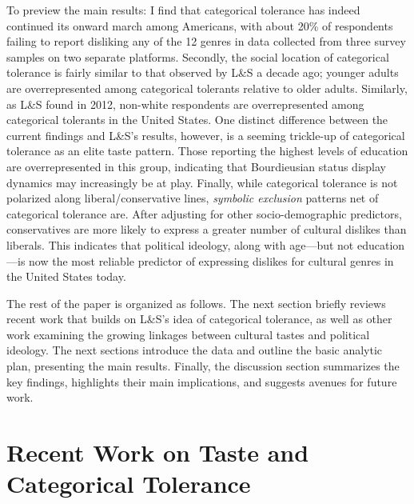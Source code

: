 \documentclass[12pt]{article}
\begin{document}
To preview the main results: I find that categorical tolerance has indeed continued its onward march among Americans, with about 20\% of respondents failing to report disliking any of the 12 genres in data collected from three survey samples on two separate platforms. Secondly, the social location of categorical tolerance is fairly similar to that observed by L\&S a decade ago; younger adults are overrepresented among categorical tolerants relative to older adults. Similarly, as L\&S found in 2012, non-white respondents are overrepresented among categorical tolerants in the United States. One distinct difference between the current findings and L\&S's results, however, is a seeming trickle-up of categorical tolerance as an elite taste pattern. Those reporting the highest levels of education are overrepresented in this group, indicating that Bourdieusian status display dynamics may increasingly be at play. Finally, while categorical tolerance is not polarized along liberal/conservative lines, \textit{symbolic exclusion} patterns net of categorical tolerance are. After adjusting for other socio-demographic predictors, conservatives are more likely to express a greater number of cultural dislikes than liberals. This indicates that political ideology, along with age---but not education---is now the most reliable predictor of expressing dislikes for cultural genres in the United States today. 

The rest of the paper is organized as follows. The next section briefly reviews recent work that builds on L\&S's idea of categorical tolerance, as well as other work examining the growing linkages between cultural tastes and political ideology. The next sections introduce the data and outline the basic analytic plan, presenting the main results. Finally, the discussion section summarizes the key findings, highlights their main implications, and suggests avenues for future work. 

\section*{Recent Work on Taste and Categorical Tolerance}
\end{document}
